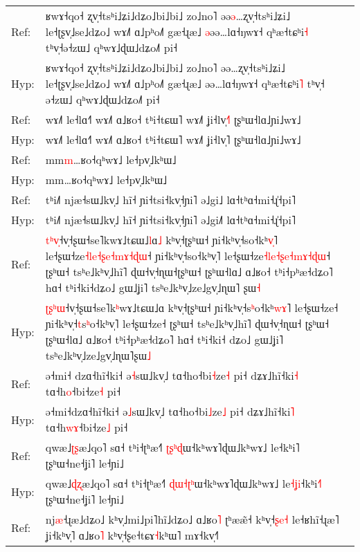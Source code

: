 \documentclass[10pt]{article}
\DeclareRobustCommand{\hl}[1]{{\textcolor{red}{#1}}}
\begin{document}
\begin{longtable}{ll}
\midrule 
Ref: & ʁwɤ˧qo˧ ʐv̩˧tsʰi˩ʑi˩dʑo˩bi˩bi˩ zo˩no˥ əə\hl{ə}…ʐv̩˧tsʰi˩ʑi˩ le˧ʈʂv̩˩se˩dʑo˩ wɤ˩˥ ɑ˩pʰo˩˥ gæ˧ɻæ˩ \hl{ə}əə…lɑ˧ŋwɤ˧ qʰæ˧tɕʰi\hl{˧} tʰv̩˧ə˧zɯ˩ qʰwɤ˩ɖɯ˩dʑo˩˥ pi˧ \\ 
Hyp: & ʁwɤ˧qo˧ ʐv̩˧tsʰi˩ʑi˩dʑo˩bi˩bi˩ zo˩no˥ əə…ʐv̩˧tsʰi˩ʑi˩ le˧ʈʂv̩˩se˩dʑo˩ wɤ˩˥ ɑ˩pʰo˩˥ gæ˧ɻæ˩ əə…lɑ˧ŋwɤ˧ qʰæ˧tɕʰi\hl{˥} tʰv̩˧\hl{ }ə˧zɯ˩ qʰwɤ˩ɖɯ˩dʑo˩˥ pi˧ \\ 
\midrule 
Ref: & wɤ˩˥ le˧lɑ˧˥ wɤ˩˥ ɑ˩ʁo˧ tʰi˧tɕɯ˥ wɤ˩˥ ʝi˧lv̩\hl{˧}˥ ʈʂʰɯ˧lɑ˩ɲi˩wɤ˩ \\ 
Hyp: & wɤ˩˥ le˧lɑ˧˥ wɤ˩˥ ɑ˩ʁo˧ tʰi˧tɕɯ˥ wɤ˩˥ ʝi˧lv̩˥ ʈʂʰɯ˧lɑ˩ɲi˩wɤ˩ \\ 
\midrule 
Ref: & mm\hl{m}…ʁo˧qʰwɤ˩ le˧pv̩˩kʰɯ˩ \\ 
Hyp: & mm…ʁo˧qʰwɤ˩ le˧pv̩˩kʰɯ˩ \\ 
\midrule 
Ref: & tʰi˩˥ njæ˧sɯ˩kv̩˩ hĩ˧ ɲi˧tsi˧kv̩˧ɲi˥ ə˩gi˩ lɑ˧tʰɑ˧mi˧ɻ̍˧pi˥ \\ 
Hyp: & tʰi˩˥ njæ˧sɯ˩kv̩˩ hĩ˧ ɲi˧tsi˧kv̩˧ɲi˥ ə˩gi˩\hl{˥} lɑ˧tʰɑ˧mi˧ɻ̍˧pi˥ \\ 
\midrule 
Ref: & \hl{t}\hl{ʰ}\hl{v}\hl{̩}˧v̩˧ʂɯ˧se˥kwɤ˩tɕɯ˩\hl{l}ɑ\hl{˩} kʰv̩˧ʈʂʰɯ˧ ɲi˧kʰv̩˧so˧kʰ\hl{v}\hl{̩}˥ le˧ʂɯ˧ze\hl{˧}\hl{l}\hl{e}\hl{˧}\hl{ʂ}\hl{e}\hl{˧}\hl{m}\hl{ɤ}\hl{˧}\hl{ɖ}\hl{ɯ}˧ ɲi˧kʰv̩˧so˧kʰv̩˥ le˧ʂɯ˧ze\hl{˧}\hl{l}\hl{e}\hl{˧}\hl{ʂ}\hl{e}\hl{˧}\hl{m}\hl{ɤ}\hl{˧}\hl{ɖ}\hl{ɯ}˧ ʈʂʰɯ˧ tsʰe˩kʰv̩˩hĩ˥ ɖɯ˧v̩˧ɳɯ˧ʈʂʰɯ˧ ʈʂʰɯ˧lɑ˩ ɑ˩ʁo˧ tʰi˧pʰæ˧dʑo˥ hɑ˧ tʰi˧ki˧dʑo˩ gɯ˩ʝi˥ tsʰe˩kʰv̩˩ze˩gv̩˩ɳɯ˥\hl{ }ʂɯ\hl{˧} \\ 
Hyp: & \hl{ʈ}\hl{ʂ}\hl{ʰ}\hl{ɯ}˧v̩˧ʂɯ˧se˥k\hl{ʰ}wɤ˩tɕɯ˩ɑ kʰv̩˧ʈʂʰɯ˧ ɲi˧kʰv̩˧s\hl{ʰ}o˧kʰ\hl{w}\hl{ɤ}˥ le˧ʂɯ˧ze˧ ɲi˧kʰv̩˧\hl{t}s\hl{ʰ}o˧kʰv̩˥ le˧ʂɯ˧ze˧ ʈʂʰɯ˧ tsʰe˩kʰv̩˩hĩ˥ ɖɯ˧v̩˧ɳɯ˧\hl{ }ʈʂʰɯ˧ ʈʂʰɯ˧lɑ˩ ɑ˩ʁo˧ tʰi˧pʰæ˧dʑo˥ hɑ˧ tʰi˧ki˧\hl{ }dʑo˩ gɯ˩ʝi˥ tsʰe˩kʰv̩˩ze˩gv̩˩ɳɯ˥ʂɯ\hl{˩} \\ 
\midrule 
Ref: & ə˧mi˧\hl{ }dzɑ˧hĩ˧ki˧ ə\hl{˧}sɯ˩kv̩˩ tɑ˧ho˧bi\hl{˧}ze\hl{˧} pi˧ dʑɤ˩hĩ˧ki\hl{˧} tɑ˧h\hl{o}˧bi˧ze\hl{˧} pi˧ \\ 
Hyp: & ə˧mi˧dzɑ˧hĩ˧ki˧ ə\hl{˩}sɯ˩kv̩˩ tɑ˧ho˧bi\hl{˩}ze\hl{˩} pi˧ dʑɤ˩hĩ˧ki\hl{˥} tɑ˧h\hl{w}\hl{ɤ}˧bi˧ze\hl{˩} pi˧ \\ 
\midrule 
Ref: & qwæ˩\hl{ʈ}\hl{ʂ}æ˩qo˥ sɑ˧ tʰi˧ʈʰæ˧˥ \hl{ʈ}\hl{ʂ}\hl{ʰ}\hl{ɖ}ɯ˧kʰwɤ˥ɖɯ˩kʰwɤ˩ le˧kʰi˥ ʈʂʰɯ˧ne˧ʝi˥ le˧ɲi˩ \\ 
Hyp: & qwæ˩\hl{ɖ}\hl{ʐ}æ˩qo˥ sɑ˧ tʰi˧ʈʰæ˧˥ \hl{ɖ}\hl{ɯ}\hl{˧}\hl{ʈ}\hl{ʰ}ɯ˧kʰwɤ˥ɖɯ˩kʰwɤ˩ le\hl{˧}\hl{ʝ}\hl{i}˧kʰi\hl{˧}˥ ʈʂʰɯ˧ne˧ʝi˥ le˧ɲi˩ \\ 
\midrule 
Ref: & nj\hl{æ}˧ɻæ˩dʑo˩ kʰv̩˩mi˩pi˥hĩ˩dʑo˩ ɑ˩ʁo\hl{˥} ʈʰææ̃˧ kʰv̩˧\hl{ʂ}\hl{e}\hl{˧} le˧ʁhĩ˧ɻæ˥ ʝi˧kʰv̩˥ ɑ˩ʁo\hl{˥} kʰv̩˧ʂe˧tɕɤ\hl{˧}kʰɯ˥ mɤ˧kv̩˧\hl{˥} \\ 

\end{longtable}
\end{document}
